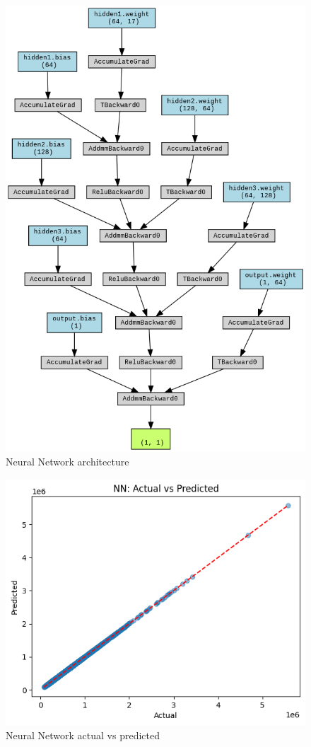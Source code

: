\documentclass[a4paper, 11pt]{article}
\begin{document}
\begin{figure}[H]
\includegraphics[scale=0.65]{NN}
\centering
\caption{Neural Network architecture}
\label{fig:NN}
\end{figure}

\begin{figure}[H]
\includegraphics[scale=0.7]{NNpred}
\centering
\caption{Neural Network actual vs predicted}
\label{fig:NNpred}
\end{figure}
\end{document}
